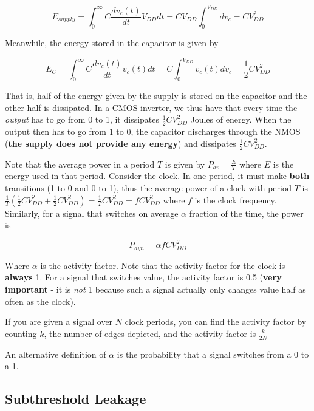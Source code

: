 \documentclass[11pt]{report}
\begin{document}
\begin{equation}
	E_{supply} = \int_{0}^{\infty} C\frac{dv_c(t)}{dt}V_{DD}dt = CV_{DD}\int_{0}^{V_{DD}}dv_c = CV_{DD}^2
\end{equation}

Meanwhile, the energy stored in the capacitor is given by

\begin{equation}
	E_C = \int_0^\infty C\frac{dv_c(t)}{dt}v_c(t)dt = C\int_0^{V_{DD}} v_c(t) dv_c = \frac{1}{2}CV_{DD}^2
\end{equation}


That is, half of the energy given by the supply is stored on the capacitor and the other half is dissipated. In a CMOS inverter, we thus have that every time the \textit{output} has to go from 0 to 1, it dissipates $\frac{1}{2}CV_{DD}^2$ Joules of energy. When the output then has to go from 1 to 0, the capacitor discharges through the NMOS (\textbf{the supply does not provide any energy}) and dissipates $\frac{1}{2}CV_{DD}^2$.

Note that the average power in a period $T$ is given by $P_{av} = \frac{E}{T}$ where $E$ is the energy used in that period. Consider the clock. In one period, it must make \textbf{both} transitions (1 to 0 and 0 to 1), thus the average power of a clock with period $T$ is $\frac{1}{T}(\frac{1}{2}CV_{DD}^2 + \frac{1}{2}CV_{DD}^2) = \frac{1}{T}CV_{DD}^2 = fCV_{DD}^2$ where $f$ is the clock frequency. Similarly, for a signal that switches on average $\alpha$ fraction of the time, the power is

\begin{equation}
	\label{eqn:dyn-power-alpha}
	P_{dyn} = \alpha f CV_{DD}^2
\end{equation}

Where $\alpha$ is the activity factor. Note that the activity factor for the clock is \textbf{always} 1. For a signal that switches value, the activity factor is 0.5 (\textbf{very important} - it is \textit{not} 1 because such a signal actually only changes value half as often as the clock).

If you are given a signal over $N$ clock periods, you can find the activity factor by counting $k$, the number of edges depicted, and the activity factor is $\frac{k}{2N}$

An alternative definition of $\alpha$ is the probability that a signal switches from a 0 to a 1.

\subsection{Subthreshold Leakage}\label{sec:subthreshold}
\end{document}
